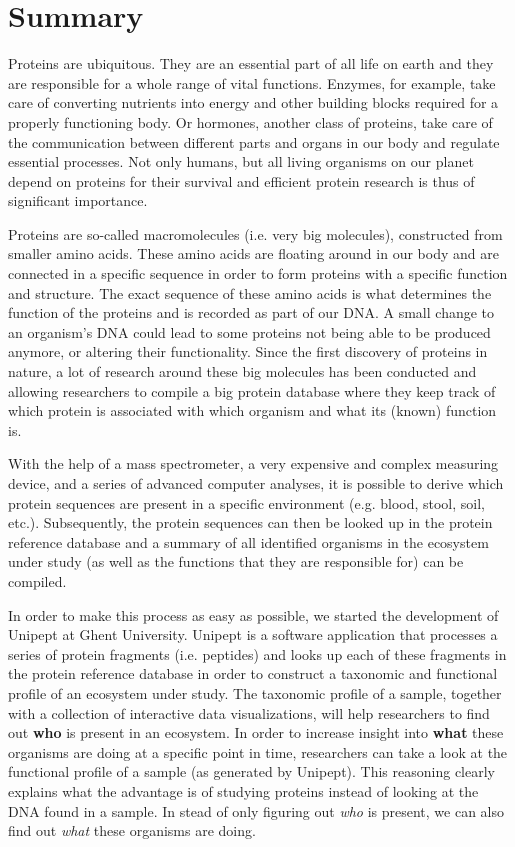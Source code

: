 \chapter*{Summary}

Proteins are ubiquitous.
They are an essential part of all life on earth and they are responsible for a whole range of vital functions.
Enzymes, for example, take care of converting nutrients into energy and other building blocks required for a properly functioning body.
Or hormones, another class of proteins, take care of the communication between different parts and organs in our body and regulate essential processes.
Not only humans, but all living organisms on our planet depend on proteins for their survival and efficient protein research is thus of significant importance.

Proteins are so-called macromolecules (i.e. very big molecules), constructed from smaller amino acids.
These amino acids are floating around in our body and are connected in a specific sequence in order to form proteins with a specific function and structure.
The exact sequence of these amino acids is what determines the function of the proteins and is recorded as part of our DNA.
A small change to an organism's DNA could lead to some proteins not being able to be produced anymore, or altering their functionality.
Since the first discovery of proteins in nature, a lot of research around these big molecules has been conducted and allowing researchers to compile a big protein database where they keep track of which protein is associated with which organism and what its (known) function is.

With the help of a mass spectrometer, a very expensive and complex measuring device, and a series of advanced computer analyses, it is possible to derive which protein sequences are present in a specific environment (e.g. blood, stool, soil, etc.).
Subsequently, the protein sequences can then be looked up in the protein reference database and a summary of all identified organisms in the ecosystem under study (as well as the functions that they are responsible for) can be compiled.

In order to make this process as easy as possible, we started the development of Unipept at Ghent University.
Unipept is a software application that processes a series of protein fragments (i.e. peptides) and looks up each of these fragments in the protein reference database in order to construct a taxonomic and functional profile of an ecosystem under study.
The taxonomic profile of a sample, together with a collection of interactive data visualizations, will help researchers to find out \textbf{who} is present in an ecosystem.
In order to increase insight into \textbf{what} these organisms are doing at a specific point in time, researchers can take a look at the functional profile of a sample (as generated by Unipept).
This reasoning clearly explains what the advantage is of studying proteins instead of looking at the DNA found in a sample.
In stead of only figuring out \textit{who} is present, we can also find out \textit{what} these organisms are doing.

